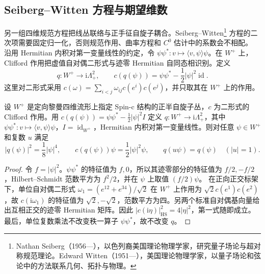\subsection{Seiberg–Witten 方程与期望维数}
\label{g3:subsec:B04:05}

另一组四维规范方程把线丛联络与正手征自旋子耦合。Seiberg--Witten\footnote{Nathan Seiberg（1956—），以色列裔美国理论物理学家，研究量子场论与超对称规范理论。Edward Witten（1951—），美国理论物理学家，以量子场论和弦论中的方法联系几何、拓扑与物理。} 方程的二次项需要固定归一化，否则规范作用、曲率方程和 \(C^0\) 估计中的系数会不相配。
\ProseParagraphBreak
沿用 Hermitian 内积对第一变量线性的约定，令
\(\psi\psi^*:v\mapsto\langle v,\psi\rangle\psi\)。在 \(W^+\) 上，Clifford 作用把虚值自对偶二形式与迹零 Hermitian 自同态相识别。定义
\begin{equation}\label{g3:eq:B-sw-quadratic-map}
 q:W^+\longrightarrow\mathrm i\Lambda^2_+,
 \qquad
 c(q(\psi))=\psi\psi^*-\frac12|\psi|^2\operatorname{id}.
\end{equation}
这里对二形式采用 \(c(\omega)=\sum_{i<j}\omega_{ij}c(e^i)c(e^j)\)，并只取其在 \(W^+\) 上的作用。

\begin{lemma}\label{g3:lem:B-sw-quadratic-norm}
 设 \(W^+\) 是定向黎曼四维流形上指定 Spin-c 结构的正半自旋子丛，\(c\) 为二形式的 Clifford 作用。用 \(c(q(\psi))=\psi\psi^*-\tfrac12|\psi|^2I\) 定义 \(q:W^+\to\mathrm i\Lambda^2_+\)，其中 \(\psi\psi^*:v\mapsto\langle v,\psi\rangle\psi\)，\(I=\operatorname{id}_{W^+}\)，Hermitian 内积对第一变量线性。则对任意 \(\psi\in W^+\) 和复数 \(u\) 满足
 \begin{equation}\label{g3:eq:B-sw-quadratic-norm}
 |q(\psi)|^2=\frac18|\psi|^4,\qquad
 c(q(\psi))\psi=\frac12|\psi|^2\psi,
 \qquad q(u\psi)=q(\psi)\quad(|u|=1).
 \end{equation}
\end{lemma}
\begin{proof}
 令 \(f=|\psi|^2\)。\(\psi\psi^*\) 的特征值为 \(f,0\)，所以其迹零部分的特征值为 \(f/2,-f/2\)，Hilbert--Schmidt 范数平方为 \(f^2/2\)，并在 \(\psi\) 上取值 \((f/2)\psi\)。
 在正向正交标架下，单位自对偶二形式
 \(\omega_1=(e^{12}+e^{34})/\sqrt2\) 在 \(W^+\) 上作用为
 \(\sqrt2c(e^1)c(e^2)\)，故 \(c(\mathrm i\omega_1)\) 的特征值为 \(\sqrt2,-\sqrt2\)，范数平方为四。另两个标准自对偶基向量给出互相正交的迹零 Hermitian 矩阵。因此
 \(|c(\mathrm i\eta)|_{\mathrm{HS}}^2=4|\eta|^2\)，第一式随即成立。最后，单位复数乘法不改变秩一算子 \(\psi\psi^*\)，故不改变 \(q\)。
\end{proof}

